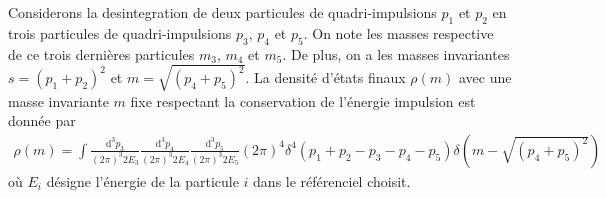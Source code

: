 Considerons la desintegration de deux particules de quadri-impulsions $p_1$ et $p_2$ en trois particules de quadri-impulsions $p_3$, $p_4$ et $p_5$. On note les masses respective de ce trois dernières particules $m_3$, $m_4$ et $m_5$. De plus, on a les masses invariantes $s = (p_1 + p_2)^2$ et $m = \sqrt{(p_4 + p_5)^2}$. La densité d'états finaux $\rho(m)$ avec une masse invariante $m$ fixe respectant la conservation de l'énergie impulsion est donnée par 
\begin{align}
    \rho(m)=\int \frac{\mathrm{d}^3 p_3}{(2 \pi)^3 2 E_3} \frac{\mathrm{d}^3 p_4}{(2 \pi)^3 2 E_4} \frac{\mathrm{d}^3 p_5}{(2 \pi)^3 2 E_5}(2 \pi)^4 \delta^4\left(p_1+p_2-p_3-p_4-p_5\right) \delta\left(m-\sqrt{\left(p_4+p_5\right)^2}\right) \label{rho}
\end{align}
où $E_{i}$ désigne l'énergie de la particule $i$ dans le référenciel choisit.

